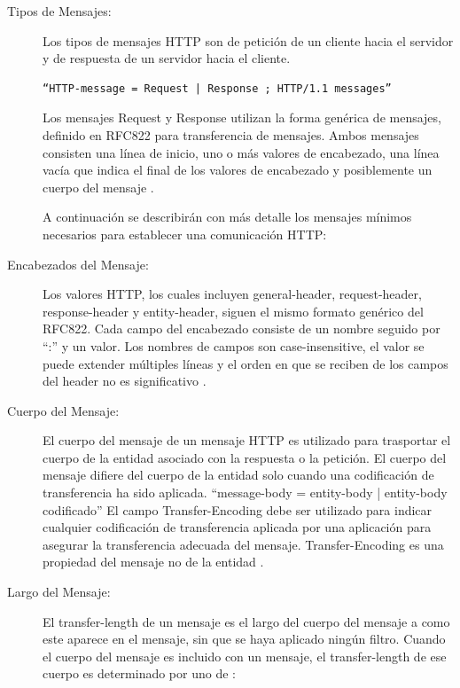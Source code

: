 \begin{description}
\item[Tipos de Mensajes:] 

Los tipos de mensajes HTTP son de petición de un cliente hacia el servidor y de respuesta de un servidor hacia el cliente.

\begin{verbatim}
“HTTP-message = Request | Response ; HTTP/1.1 messages”
\end{verbatim}

Los mensajes Request y Response utilizan la forma genérica de mensajes, definido en RFC822 para transferencia de mensajes. Ambos mensajes consisten una línea de inicio, uno o más valores de encabezado, una línea vacía que indica el final de los valores de encabezado y posiblemente un cuerpo del mensaje \cite{rfc2616}.

A continuación se describirán con más detalle los mensajes mínimos necesarios para establecer una comunicación HTTP: 

\item[Encabezados del Mensaje:] 
Los valores HTTP, los cuales incluyen general-header, request-header, response-header y entity-header, siguen el mismo formato genérico del RFC822. Cada campo del encabezado consiste de un nombre seguido por “:” y un valor. Los nombres de campos son case-insensitive, el valor se puede extender múltiples líneas y el orden en que se reciben de los campos del header no es significativo \cite{rfc2616}.

\item[Cuerpo del Mensaje:] 

El cuerpo del mensaje de un mensaje HTTP es utilizado para trasportar el cuerpo de la entidad asociado con la respuesta o la petición. El cuerpo del mensaje difiere del cuerpo de la entidad solo cuando una codificación de transferencia ha sido aplicada. “message-body = entity-body | entity-body codificado”  
El campo Transfer-Encoding debe ser utilizado para indicar cualquier codificación de transferencia aplicada por una aplicación para asegurar la transferencia adecuada del mensaje. Transfer-Encoding es una propiedad del mensaje no de la entidad \cite{rfc2616}.

\item[Largo del Mensaje:] 

El transfer-length de un mensaje es el largo del cuerpo del mensaje a como este aparece en el mensaje, sin que se haya aplicado ningún filtro. Cuando el cuerpo del mensaje es incluido con un mensaje, el transfer-length de ese cuerpo es determinado por uno de \cite{rfc2616}: 
\begin{itemize}


\end{itemize}
\end{description}
